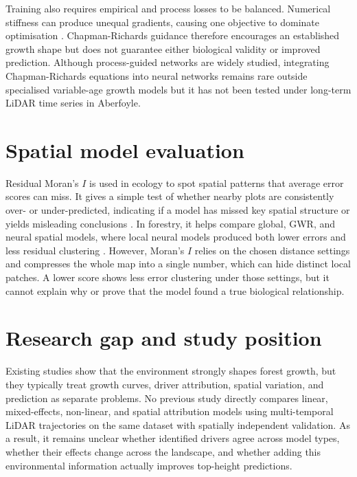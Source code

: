 \documentclass[logo,msc,ai]{infthesis}           %
\begin{document}
Training also requires empirical and process losses to be balanced. Numerical stiffness can produce unequal gradients, causing one objective to dominate optimisation \cite{wang2021Understanding_C4_NN}. Chapman-Richards guidance therefore encourages an established growth shape but does not guarantee either biological validity or improved prediction. Although process-guided networks are widely studied, integrating Chapman-Richards equations into neural networks remains rare outside specialised variable-age growth models but it has not been tested under long-term LiDAR time series in Aberfoyle.

\section{Spatial model evaluation}
Residual Moran's $I$ is used in ecology to spot spatial patterns that average error scores can miss. It gives a simple test of whether nearby plots are consistently over- or under-predicted, indicating if a model has missed key spatial structure or yields misleading conclusions \cite{moran1950Notes_c5_eval,kim2021Predicting_C5_EVAL}. In forestry, it helps compare global, GWR, and neural spatial models, where local neural models produced both lower errors and less residual clustering \cite{sun2022Local_C4_NN}. However, Moran's $I$ relies on the chosen distance settings and compresses the whole map into a single number, which can hide distinct local patches. A lower score shows less error clustering under those settings, but it cannot explain why or prove that the model found a true biological relationship.

\section{Research gap and study position}
Existing studies show that the environment strongly shapes forest growth, but they typically treat growth curves, driver attribution, spatial variation, and prediction as separate problems. No previous study directly compares linear, mixed-effects, non-linear, and spatial attribution models using multi-temporal LiDAR trajectories on the same dataset with spatially independent validation. As a result, it remains unclear whether identified drivers agree across model types, whether their effects change across the landscape, and whether adding this environmental information actually improves top-height predictions.
\end{document}
